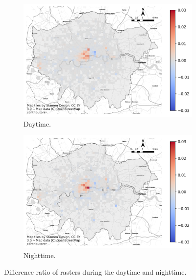 \documentclass{article}
\begin{document}
\begin{figure}[!h]

\begin{subfigure}{0.5\textwidth}
\includegraphics[width=1\linewidth]{figures/raster_diff_daytime.png} 
\caption{Daytime.}
\label{fig:raster_diff_daytime}
\end{subfigure}
\begin{subfigure}{0.5\textwidth}
\includegraphics[width=1\linewidth]{figures/raster_diff_nighttime.png}
\caption{Nighttime.}
\label{fig:raster_diff_nighttime}
\end{subfigure}

\caption{Difference ratio of rasters during the daytime and nighttime.} \label{fig:raster_diff_day}
\end{figure}
\end{document}
